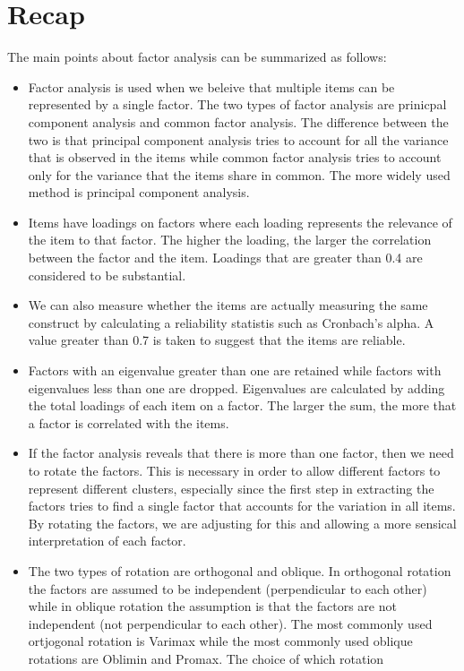 \documentclass[a4paper,12pt,oneside]{book}
\begin{document}
\section{Recap}
The main points about factor analysis can be summarized as follows:
\begin{itemize}
	\item Factor analysis is used when we beleive that multiple items can be represented by a single factor. The two types of factor analysis are
	prinicpal component analysis and common factor analysis. The difference between the two is that principal component analysis tries to account 
	for all the variance that is observed in the items while common factor analysis tries to account only for the variance that the items share in 
	common. The more widely used method is principal component analysis.  
	\item Items have loadings on factors where each loading represents the relevance of the item to that factor. The higher the loading, the
	larger the correlation between the factor and the item. Loadings that are greater than 0.4 are considered to be substantial.
	\item We can also measure whether the items are actually measuring the same construct by calculating a reliability statistis such as
	Cronbach's alpha. A value greater than 0.7 is taken to suggest that the items are reliable.
	\item Factors with an eigenvalue greater than one are retained while factors with eigenvalues less than one are dropped. Eigenvalues are
	calculated by adding the total loadings of each item on a factor. The larger the sum, the more that a factor is correlated with the items.
	\item If the factor analysis reveals that there is more than one factor, then we need to rotate the factors. This is necessary in order to allow
	different factors to represent different clusters, especially since the first step in extracting the factors tries to find a single factor that
	accounts for the variation in all items. By rotating the factors, we are adjusting for this and allowing a more sensical interpretation of each
	factor.
	\item The two types of rotation are orthogonal and oblique. In orthogonal rotation the factors are assumed to be independent (perpendicular to
	each other) while in oblique rotation the assumption is that the factors are not independent (not perpendicular to each other). The most
	commonly used ortjogonal rotation is Varimax while the most commonly used oblique rotations are Oblimin and Promax. The choice of which rotation

\end{itemize}
\end{document}
